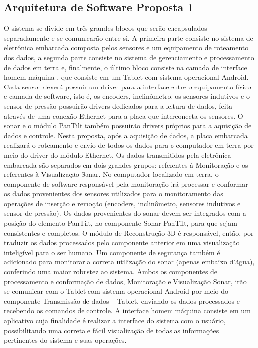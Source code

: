 \subsection{Arquitetura de Software Proposta 1}
O sistema se divide em três grandes blocos que serão encapsulados separadamente e se comunicarão entre si. A primeira parte consiste no sistema de eletrônica embarcada composta pelos sensores e um equipamento de roteamento dos dados, a segunda parte consiste no sistema de gerenciamento e processamento de dados em terra e, finalmente, o último bloco consiste na camada de interface homem-máquina , que consiste em um Tablet com sistema operacional Android.
Cada sensor deverá possuir um driver para a interface entre o equipamento físico e camada de software, isto é, os encoders, inclinômetro, os sensores indutivos e o sensor de pressão possuirão drivers dedicados para a leitura de dados, feita através de uma conexão Ethernet para a placa que interconecta os sensores. O sonar e o módulo PanTilt também possuirão drivers próprios para a aquisição de dados e controle. 
Nesta proposta, após a aquisição de dados, a placa embarcada realizará o roteamento e envio de todos os dados para o computador em terra por meio do driver do módulo Ethernet.  Os dados transmitidos pela eletrônica embarcada são separados em dois grandes grupos: referentes à Monitoração e os referentes à Visualização Sonar. 
No computador localizado em terra, o componente de software responsável pela monitoração irá processar e conformar os dados provenientes dos sensores utilizados para o monitoramento das operações de inserção e remoção (encoders, inclinômetro, sensores indutivos e sensor de pressão). Os dados provenientes do sonar devem ser integrados com a posição do elemento PanTilt, no componente Sonar-PanTilt, para que sejam consistentes e completos.  O módulo de Reconstrução 3D é responsável, então, por traduzir os dados processados pelo componente anterior em uma visualização inteligível para o ser humano.  Um componente de segurança também é adicionado para monitorar a correta utilização do sonar (apenas embaixo d’água), conferindo uma maior robustez ao sistema. 
Ambos os componentes de processamento e conformação de dados, Monitoração e Visualização Sonar, irão se comunicar com o Tablet com sistema operacional Android por meio do componente Transmissão de dados – Tablet, enviando os dados processados e recebendo os comandos de controle.  A interface homem máquina consiste em um aplicativo cuja finalidade é realizar a interface do sistema com o usuário, possibilitando uma correta e fácil visualização de todas as informações pertinentes do sistema e suas operações.